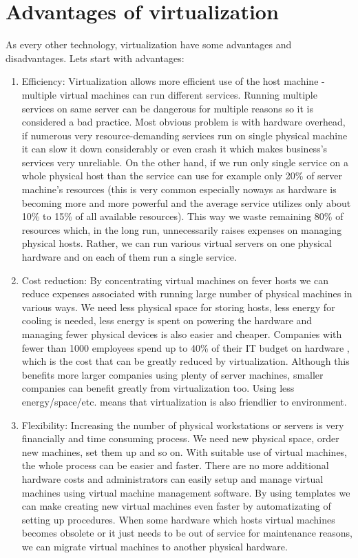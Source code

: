 \begin{itemize}
\end{itemize}

\section{Advantages of virtualization}
As every other technology, virtualization have some advantages and disadvantages. Lets start with advantages:
\begin{enumerate}
\item Efficiency: Virtualization allows more efficient use of the host machine - multiple virtual machines can run different services. Running multiple services on same server can be dangerous for multiple reasons so it is considered a bad practice. Most obvious problem is with hardware overhead, if numerous very resource-demanding services run on single physical machine it can slow it down considerably or even crash it which makes business's services very unreliable. On the other hand, if we run only single service on a whole physical host than the service can use for example only 20\% of server machine's resources (this is very common especially noways as hardware is becoming more and more powerful and the average service utilizes only about 10\% to 15\% of all available resources). This way we waste remaining 80\% of resources which, in the long run, unnecessarily raises expenses on managing physical hosts. Rather, we can run various virtual servers on one physical hardware and on each of them run a single service.
\item Cost reduction: By concentrating virtual machines on fever hosts we can reduce expenses associated with running large number of physical machines in various ways. We need less physical space for storing hosts, less energy for cooling is needed, less energy is spent on powering the hardware and managing fewer physical devices is also easier and cheaper. Companies with fewer than 1000 employees spend up to 40\% of their IT budget on hardware \cite{virt_book}, which is the cost that can be greatly reduced by virtualization. Although this benefits more larger companies using plenty of server machines, smaller companies can benefit greatly from virtualization too. Using less energy/space/etc. means that virtualization is also friendlier to environment.
\item Flexibility: Increasing the number of physical workstations or servers is very financially and time consuming process. We need new physical space, order new machines, set them up and so on. With suitable use of virtual machines, the whole process can be easier and faster. There are no more additional hardware costs and administrators can easily setup and manage virtual machines using virtual machine management software. By using templates we can make creating new virtual machines even faster by automatizating of setting up procedures. When some hardware which hosts virtual machines becomes obsolete or it just needs to be out of service for maintenance reasons, we can migrate virtual machines to another physical hardware.

\end{enumerate}

